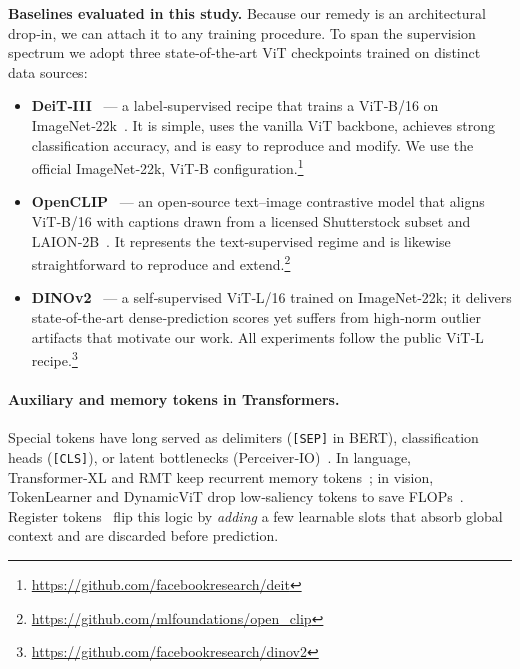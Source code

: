 \documentclass{article}
\newcommand{\citep}{\parencite}
\begin{document}
\vspace{0.3em}\noindent
\textbf{Baselines evaluated in this study.}  
Because our remedy is an architectural drop‑in, we can attach it to any training procedure.  
To span the supervision spectrum we adopt three state‑of‑the‑art ViT checkpoints trained on distinct data sources:

\begin{itemize}
  \item \textbf{DeiT‑III} \citep{touvronDeiTIIIRevenge2022} — a label‑supervised recipe that trains a ViT‑B/16 on ImageNet‑22k \citep{dengImageNetLargescaleHierarchical2009}.
        It is simple, uses the vanilla ViT backbone, achieves strong classification accuracy, and is easy to reproduce and modify.  
        We use the official ImageNet‑22k, ViT‑B configuration.\footnote{\url{https://github.com/facebookresearch/deit}}
  \item \textbf{OpenCLIP} \citep{ilharco_gabriel_2021_5143773} — an open‑source text–image contrastive model that aligns ViT‑B/16 with captions drawn from a licensed Shutterstock subset and LAION‑2B \citep{schuhmannLAION5BOpenLargescale2022}.
        It represents the text‑supervised regime and is likewise straightforward to reproduce and extend.\footnote{\url{https://github.com/mlfoundations/open_clip}}
  \item \textbf{DINOv2} \citep{oquabDINOv2LearningRobust2024} — a self‑supervised ViT‑L/16 trained on ImageNet‑22k; it delivers state‑of‑the‑art dense‑prediction scores yet suffers from high‑norm outlier artifacts that motivate our work.
        All experiments follow the public ViT‑L recipe.\footnote{\url{https://github.com/facebookresearch/dinov2}}
\end{itemize}

\paragraph{Auxiliary and memory tokens in Transformers.}
Special tokens have long served as delimiters (\texttt{[SEP]} in BERT), classification heads (\texttt{[CLS]}), or latent bottlenecks (Perceiver‑IO) \citep{devlinBERTPretrainingDeep2019,jaeglePerceiverIOGeneral2021}.  
In language, Transformer‑XL and RMT keep recurrent memory tokens \citep{bulatovRecurrentMemoryTransformer2022}; in vision, TokenLearner and DynamicViT drop low‑saliency tokens to save FLOPs \citep{ryooTokenLearnerAdaptiveSpacetime2021,raoDynamicViTEfficientVision2021}.  
Register tokens \citep{darcetVisionTransformersNeed2024} flip this logic by \emph{adding} a few learnable slots that absorb global context and are discarded before prediction.
\end{document}
